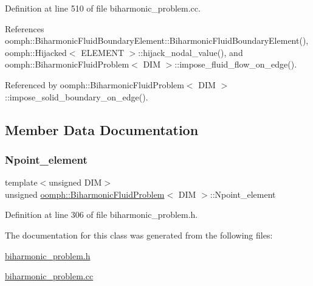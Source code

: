 Definition at line 510 of file biharmonic\+\_\+problem.\+cc.



References oomph\+::\+Biharmonic\+Fluid\+Boundary\+Element\+::\+Biharmonic\+Fluid\+Boundary\+Element(), oomph\+::\+Hijacked$<$ E\+L\+E\+M\+E\+N\+T $>$\+::hijack\+\_\+nodal\+\_\+value(), and oomph\+::\+Biharmonic\+Fluid\+Problem$<$ D\+I\+M $>$\+::impose\+\_\+fluid\+\_\+flow\+\_\+on\+\_\+edge().



Referenced by oomph\+::\+Biharmonic\+Fluid\+Problem$<$ D\+I\+M $>$\+::impose\+\_\+solid\+\_\+boundary\+\_\+on\+\_\+edge().



\subsection{Member Data Documentation}
\mbox{\label{classoomph_1_1BiharmonicFluidProblem_a2dd20deeccc884a3859577a0b7f636e9}} 
\subsubsection{\texorpdfstring{Npoint\+\_\+element}{Npoint\_element}}
{\footnotesize\ttfamily template$<$unsigned D\+IM$>$ \\
unsigned \hyperlink{classoomph_1_1BiharmonicFluidProblem}{oomph\+::\+Biharmonic\+Fluid\+Problem}$<$ D\+IM $>$\+::Npoint\+\_\+element\hspace{0.3cm}{\ttfamily [private]}}



Definition at line 306 of file biharmonic\+\_\+problem.\+h.



The documentation for this class was generated from the following files\+:\begin{DoxyCompactItemize}
\item 
\hyperlink{biharmonic__problem_8h}{biharmonic\+\_\+problem.\+h}\item 
\hyperlink{biharmonic__problem_8cc}{biharmonic\+\_\+problem.\+cc}\end{DoxyCompactItemize}
